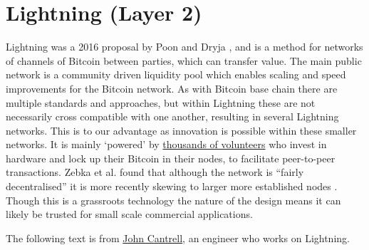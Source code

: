 \section{Lightning (Layer 2)}
Lightning was a 2016 proposal by Poon and Dryja \cite{poon2016bitcoin}, and is a method for networks of channels of Bitcoin between parties, which can transfer value. The main public network is a community driven liquidity pool which enables scaling and speed improvements for the Bitcoin network. As with Bitcoin base chain there are multiple standards and approaches, but within Lightning these are not necessarily cross compatible with one another, resulting in several Lightning networks. This is to our advantage as innovation is possible within these smaller networks. It is mainly `powered' by \href{https://plebnet.wiki/wiki/Main_Page}{thousands of volunteers} who invest in hardware and lock up their Bitcoin in their nodes, to facilitate peer-to-peer transactions. Zebka et al. found that although the network is ``fairly decentralised'' it is more recently skewing to larger more established nodes \cite{zabka2022short}. Though this is a grassroots technology the nature of the design means it can likely be trusted for small scale commercial applications.\par
The following text is from \href{https://medium.com/@johncantrell97?p=5cc72f2c664}{John Cantrell}, an engineer who works on Lightning.\par

